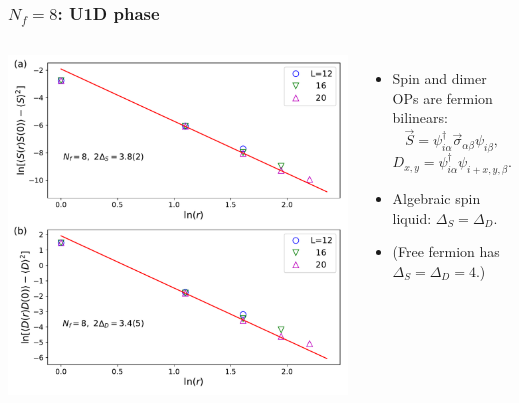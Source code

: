 \documentclass[xcolor=table, 10pt, aspectratio=169]{beamer}
\begin{document}
\begin{frame}
  \frametitle{$N_f=8$: U1D phase}
  \begin{columns}
    \includegraphics[width=\textwidth]{n8decay}
		\begin{itemize}
			\item Spin and dimer OPs are fermion bilinears:
			\[\vec S = \psi^\dagger_{i\alpha}\vec\sigma_{\alpha\beta}\psi_{i\beta},\]
			\[D_{x,y} = \psi^\dagger_{i\alpha}\psi_{i+x,y,\beta}.\]
			\item Algebraic spin liquid: $\Delta_S = \Delta_D$.
		  \item (Free fermion has $\Delta_S=\Delta_D = 4$.)
		\end{itemize}
  \end{columns}
\end{frame}
\end{document}
